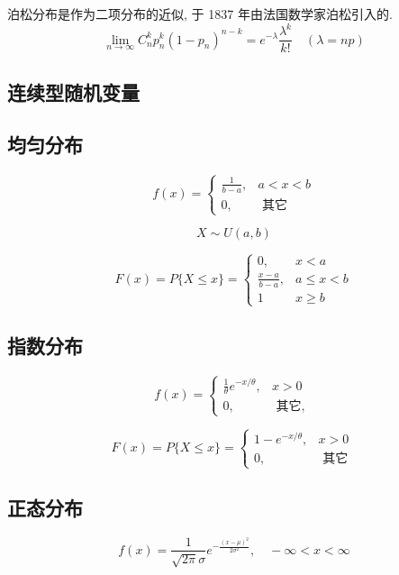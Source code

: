 \begin{theorem}[泊松定理]
    \label{thm:Poission}
泊松分布是作为二项分布的近似, 于 1837 年由法国数学家泊松引入的.
$$
\lim _{n \rightarrow \infty} C_{n}^{k} p_{n}^{k}\left(1-p_{n}\right)^{n-k}=e^{-\lambda} \frac{\lambda^{k}}{k !}\quad (\lambda = np)
$$
\end{theorem}

\subsection{连续型随机变量}

\subsection{均匀分布}

$$
f(x)=\left\{\begin{array}{cc}
\frac{1}{b-a}, & a<x<b \\
0, & \text { 其它 }
\end{array}\right.
$$

$$ X \sim U(a,b) $$

$$
F(x)=P\{X \leq x\}=\left\{\begin{array}{ll}
0, & x<a \\
\frac{x-a}{b-a}, & a \leq x<b \\
1 & x \geq b
\end{array}\right.
$$

\subsection{指数分布}

$$
f(x)=\left\{\begin{array}{ll}
\frac{1}{\theta} e^{-x / \theta}, & x>0 \\
0, & \text { 其它, }
\end{array}\right.
$$

$$
F(x)=P\{X \leq x\}=\left\{\begin{array}{ll}
1-e^{-x / \theta}, & x>0 \\
0, & \text { 其它 }
\end{array}\right.
$$

\subsection{正态分布}

$$
f(x)=\frac{1}{\sqrt{2 \pi} \sigma} e^{-\frac{(x-\mu)^{2}}{2 \sigma^{2}}}, \quad-\infty<x<\infty
$$

